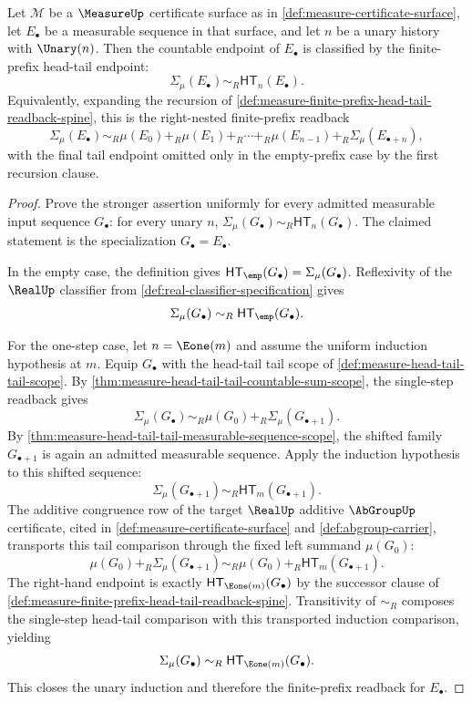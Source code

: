 \begin{theorem}
\label{thm:measure-finite-prefix-head-tail-readback}
Let $\mathcal{M}$ be a $\MeasureUp$ certificate surface as in
\autoref{def:measure-certificate-surface}, let $E_\bullet$ be a measurable
sequence in that surface, and let $n$ be a unary history with $\Unary(n)$. Then
the countable endpoint of $E_\bullet$ is classified by the finite-prefix
head-tail endpoint:
$$
\Sigma_\mu(E_\bullet)\sim_R\mathsf{HT}_n(E_\bullet).
$$
Equivalently, expanding the recursion of
\autoref{def:measure-finite-prefix-head-tail-readback-spine}, this is the
right-nested finite-prefix readback
$$
\Sigma_\mu(E_\bullet)\sim_R
\mu(E_0)+_R\mu(E_1)+_R\cdots+_R\mu(E_{n-1})+_R\Sigma_\mu(E_{\bullet+n}),
$$
with the final tail endpoint omitted only in the empty-prefix case by the first
recursion clause.
\end{theorem}
\begin{proof}
Prove the stronger assertion uniformly for every admitted measurable input
sequence $G_\bullet$: for every unary $n$,
$\Sigma_\mu(G_\bullet)\sim_R\mathsf{HT}_n(G_\bullet)$. The claimed statement is
the specialization $G_\bullet=E_\bullet$.

In the empty case, the definition gives
$\mathsf{HT}_{\emp}(G_\bullet)=\Sigma_\mu(G_\bullet)$. Reflexivity of the
$\RealUp$ classifier from \autoref{def:real-classifier-specification} gives
$$
\Sigma_\mu(G_\bullet)\sim_R\mathsf{HT}_{\emp}(G_\bullet).
$$

For the one-step case, let $n=\Eone(m)$ and assume the uniform induction
hypothesis at $m$. Equip $G_\bullet$ with the head-tail tail scope of
\autoref{def:measure-head-tail-tail-scope}. By
\autoref{thm:measure-head-tail-tail-countable-sum-scope}, the single-step
readback gives
$$
\Sigma_\mu(G_\bullet)\sim_R
\mu(G_0)+_R\Sigma_\mu(G_{\bullet+1}).
$$
By \autoref{thm:measure-head-tail-tail-measurable-sequence-scope}, the shifted
family $G_{\bullet+1}$ is again an admitted measurable sequence. Apply the
induction hypothesis to this shifted sequence:
$$
\Sigma_\mu(G_{\bullet+1})\sim_R\mathsf{HT}_m(G_{\bullet+1}).
$$
The additive congruence row of the target $\RealUp$ additive $\AbGroupUp$
certificate, cited in \autoref{def:measure-certificate-surface} and
\autoref{def:abgroup-carrier}, transports this tail comparison through the
fixed left summand $\mu(G_0)$:
$$
\mu(G_0)+_R\Sigma_\mu(G_{\bullet+1})\sim_R
\mu(G_0)+_R\mathsf{HT}_m(G_{\bullet+1}).
$$
The right-hand endpoint is exactly
$\mathsf{HT}_{\Eone(m)}(G_\bullet)$ by the successor clause of
\autoref{def:measure-finite-prefix-head-tail-readback-spine}. Transitivity of
$\sim_R$ composes the single-step head-tail comparison with this transported
induction comparison, yielding
$$
\Sigma_\mu(G_\bullet)\sim_R\mathsf{HT}_{\Eone(m)}(G_\bullet).
$$
This closes the unary induction and therefore the finite-prefix readback for
$E_\bullet$.
\end{proof}
